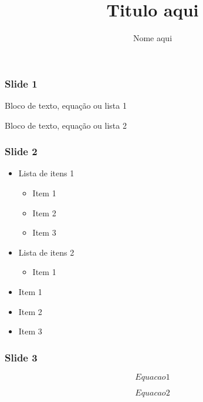 \documentclass{beamer}
\title[Subtitulo aqui]{Titulo aqui}
\author{Nome aqui}
\institute[Sigla opcional]
{
Nome da instituição aqui \\
\medskip
\textit{email aqui}
}
\date{}
\begin{document}
\begin{frame}
\titlepage
\end{frame}


\begin{frame}
\frametitle{Slide 1}

\begin{block}{}
Bloco de texto, equação ou lista 1
\end{block}

\begin{block}{}
Bloco de texto, equação ou lista 2
\end{block}

\end{frame}

\begin{frame}
\frametitle{Slide 2}

\begin{itemize}

\item Lista de itens 1

\begin{itemize}
    \item Item 1
    \item Item 2
    \item Item 3
\end{itemize}

\item Lista de itens 2

\begin{itemize}
    \item Item 1
\end{itemize}

\item Item 1
\item Item 2
\item Item 3

\end{itemize}

\end{frame}

\begin{frame}
\frametitle{Slide 3}

\begin{equation}
	Equacao 1
	\label{citacao1}
\end{equation}

\begin{equation}
    Equacao 2
    \label{citacao2}
\end{equation}

\end{frame}
\end{document}
